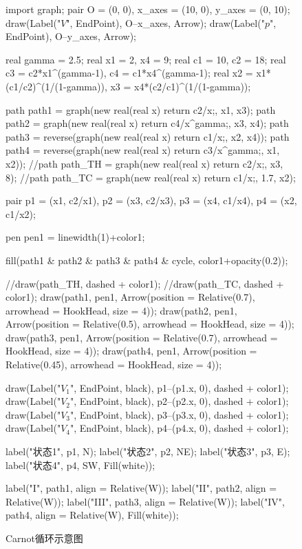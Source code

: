 		\begin{figure}[h]
			\begin{asy}
				import graph;
				pair O = (0, 0), x_axes = (10, 0), y_axes = (0, 10);
				draw(Label("$V$", EndPoint), O--x_axes, Arrow);
				draw(Label("$p$", EndPoint), O--y_axes, Arrow);
				
				real gamma = 2.5;
				real x1 = 2, x4 = 9;
				real c1 = 10, c2 = 18;
				real c3 = c2*x1^(gamma-1), c4 = c1*x4^(gamma-1);
				real x2 = x1*(c1/c2)^(1/(1-gamma)), x3 = x4*(c2/c1)^(1/(1-gamma));
				
				path path1 = graph(new real(real x) {return c2/x;}, x1, x3);
				path path2 = graph(new real(real x) {return c4/x^gamma;}, x3, x4);
				path path3 = reverse(graph(new real(real x) {return c1/x;}, x2, x4));
				path path4 = reverse(graph(new real(real x) {return c3/x^gamma;}, x1, x2));
				//path path_TH = graph(new real(real x) {return c2/x;}, x3, 8);
				//path path_TC = graph(new real(real x) {return c1/x;}, 1.7, x2);
				
				pair p1 = (x1, c2/x1), p2 = (x3, c2/x3), p3 = (x4, c1/x4), p4 = (x2, c1/x2);
				
				pen pen1 = linewidth(1)+color1;
				
				fill(path1 & path2 & path3 & path4 & cycle, color1+opacity(0.2));
				
				//draw(path_TH, dashed + color1);
				//draw(path_TC, dashed + color1);
				draw(path1, pen1, Arrow(position = Relative(0.7), arrowhead = HookHead, size = 4));
				draw(path2, pen1, Arrow(position = Relative(0.5), arrowhead = HookHead, size = 4));
				draw(path3, pen1, Arrow(position = Relative(0.7), arrowhead = HookHead, size = 4));
				draw(path4, pen1, Arrow(position = Relative(0.45), arrowhead = HookHead, size = 4));
				
				draw(Label("$V_1$", EndPoint, black), p1--(p1.x, 0), dashed + color1);
				draw(Label("$V_2$", EndPoint, black), p2--(p2.x, 0), dashed + color1);
				draw(Label("$V_3$", EndPoint, black), p3--(p3.x, 0), dashed + color1);
				draw(Label("$V_4$", EndPoint, black), p4--(p4.x, 0), dashed + color1);
				
				label("状态1", p1, N);
				label("状态2", p2, NE);
				label("状态3", p3, E);
				label("状态4", p4, SW, Fill(white));
				
				label("I", path1, align = Relative(W));
				label("II", path2, align = Relative(W));
				label("III", path3, align = Relative(W));
				label("IV", path4, align = Relative(W), Fill(white));
			\end{asy}
			\caption{Carnot循环示意图}
			\label{FIG_CARNOT_CYCLE}
		\end{figure}
		
